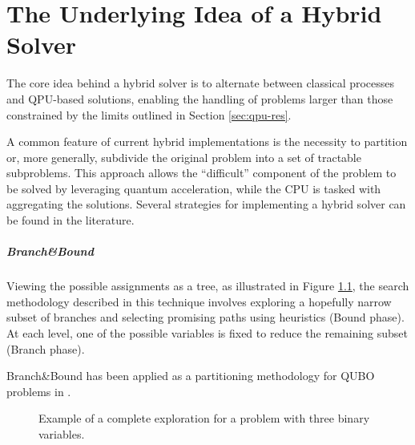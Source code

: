 \chapter{The Underlying Idea of a Hybrid Solver}

The core idea behind a hybrid solver is to alternate between classical processes and QPU-based solutions, enabling the handling of problems larger than those constrained by the limits outlined in Section \ref{sec:qpu-res}.

A common feature of current hybrid implementations is the necessity to partition or, more generally, subdivide the original problem into a set of tractable subproblems. 
This approach allows the ``difficult'' component of the problem to be solved by leveraging quantum acceleration, while the CPU is tasked with aggregating the solutions.
Several strategies for implementing a hybrid solver can be found in the literature.

\paragraph{Branch\&Bound} Viewing the possible assignments as a tree, as illustrated in Figure \ref{fig:assignment}, the search methodology described in this technique involves exploring a hopefully narrow subset of branches and selecting promising paths using heuristics (Bound phase). 
At each level, one of the possible variables is fixed to reduce the remaining subset (Branch phase).

Branch\&Bound has been applied as a partitioning methodology for QUBO problems in \cite{QBNB}.

\begin{figure}
    \centering
    \caption{Example of a complete exploration for a problem with three binary variables.}
    \label{fig:assignment}
\end{figure}

